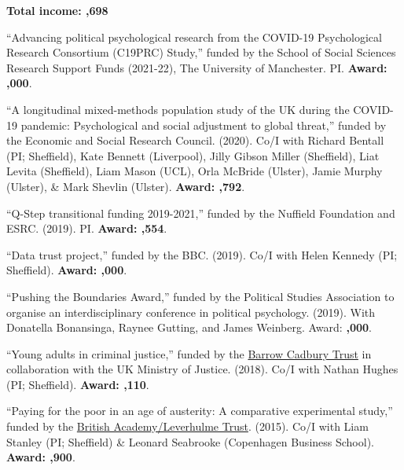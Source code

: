 \documentclass[12pt]{article}
\begin{document}
\begin{bibsection}
	\item \textbf{Total income: ,698}
	
	\item ``Advancing political psychological research from the COVID-19 Psychological Research Consortium (C19PRC) Study,'' funded by the School of Social Sciences Research Support Funds (2021-22), The University of Manchester. PI. \textbf{Award: ,000}. 

\item ``A longitudinal mixed-methods population study of the UK during the COVID-19 pandemic: Psychological and social adjustment to global threat,'' funded by the Economic and Social Research Council. (2020). Co\-/I with Richard Bentall (PI; Sheffield), Kate Bennett (Liverpool), Jilly Gibson Miller (Sheffield), Liat Levita (Sheffield), Liam Mason (UCL), Orla McBride (Ulster), Jamie Murphy (Ulster), \& Mark Shevlin (Ulster). \textbf{Award: ,792}. 

	\item ``Q-Step transitional funding 2019-2021,'' funded by the Nuffield Foundation and ESRC. (2019). PI. \textbf{Award: ,554}.

	\item ``Data trust project,'' funded by the BBC. (2019). Co\-/I with 
	Helen Kennedy (PI; Sheffield). \textbf{Award: ,000}. 
	
	    \item ``Pushing the Boundaries Award,'' funded by the Political Studies Association to organise an interdisciplinary conference in political psychology. (2019). With Donatella Bonansinga, Raynee Gutting, and James Weinberg. Award: \textbf{,000}. 

	\item ``Young adults in criminal justice,'' funded by the 
	\href{https://www.barrowcadbury.org.uk/}{Barrow Cadbury Trust} in collaboration with 
	the UK Ministry of Justice. 
 	(2018). Co\-/I with Nathan Hughes (PI; Sheffield). \textbf{Award: ,110}.
 	
 	 \item ``Paying for the poor in an age of austerity: 
    A comparative experimental study,'' funded by the \href{http://www.britac.ac.uk/index.cfm}
    {British Academy/Leverhulme Trust}.
   (2015). Co\-/I with Liam Stanley (PI; Sheffield) \& Leonard 
    Seabrooke (Copenhagen Business School).  \textbf{Award: ,900}.
 	

\end{bibsection}
\end{document}
